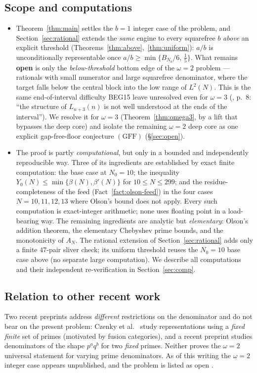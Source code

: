 \documentclass[11pt]{amsart}
\theoremstyle{plain}
\theoremstyle{definition}
\begin{document}
\subsection{Scope and computations}\label{ssec:scope}
\begin{itemize}[leftmargin=1.5em]
\item Theorem~\ref{thm:main} settles the $b=1$ integer case of the problem, and
Section~\ref{sec:rational} extends the \emph{same} engine to every squarefree $b$
\emph{above} an explicit threshold (Theorems~\ref{thm:above},~\ref{thm:uniform}):
$a/b$ is unconditionally representable once $a/b\ge\min\{B_{N_b}/6,\,\tfrac15\}$.  What
remains \textbf{open} is only the \emph{below-threshold} bottom edge of the
$\omega=2$ problem --- rationals with small numerator and large squarefree
denominator, where the target falls below the central block into the low range of
$L^2(N)$.  This is the same end-of-interval difficulty BEG15 leave unresolved even
for $\omega=3$ (\cite{BEG2015}, p.~8: ``the structure of $L_{n+3}(n)$ is not well
understood at the ends of the interval'').  We resolve it for $\omega=3$
(Theorem~\ref{thm:omega3}, by a lift that bypasses the deep core) and isolate the
remaining $\omega=2$ deep core as one explicit gap-free-floor conjecture
$(\mathrm{GFF})$ (\S\ref{sec:open}).

\item The proof is partly \emph{computational}, but only in a bounded and
independently reproducible way.  Three of its ingredients are established by
exact finite computation: the base case at $N_0=10$; the inequality
$Y_0(N)\le\min\{\beta(N),\beta'(N)\}$ for $10\le N\le 299$; and the residue-completeness
of the feed (Fact~\ref{fact:olson-feed}) in the four cases $N=10,11,12,13$ where
Olson's bound does not apply.  Every such
computation is exact-integer arithmetic; none uses floating point in a
load-bearing way.  The remaining ingredients are analytic but \emph{elementary}:
Olson's addition theorem, the elementary Chebyshev prime bounds, and the
monotonicity of $A_N$.  The rational extension of Section~\ref{sec:rational} adds
only a finite $47$-pair sliver check; its uniform threshold reuses the $N_0=10$
base case above (no separate large computation).  We
describe all computations and their independent re-verification in
Section~\ref{sec:comp}.
\end{itemize}

\subsection{Relation to other recent work}
Two recent preprints address \emph{different} restrictions on the
denominator and do not bear on the present problem: Czenky et al.\
\cite{Czenky2025} study representations using a \emph{fixed finite} set of primes
(motivated by fusion categories), and a recent preprint \cite{TwoPrimePowers}
studies denominators of the shape $p^aq^b$ for two \emph{fixed} primes.  Neither
proves the $\omega=2$ universal statement for varying prime denominators.  As of
this writing the $\omega=2$ integer case appears unpublished, and the problem is
listed as open \cite{Bloom306}.
\end{document}
